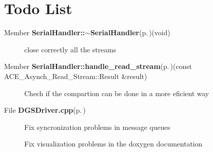 \section{Todo List}\label{todo}
\label{todo__todo000002}
 \begin{description}
\item[Member {\bf Serial\-Handler::$\sim$Serial\-Handler}{\rm (p.\,\pageref{classSerialHandler_a1})}(void) ]close correctly all the streams \end{description}


\label{todo__todo000003}
 \begin{description}
\item[Member {\bf Serial\-Handler::handle\_\-read\_\-stream}{\rm (p.\,\pageref{classSerialHandler_b0})}(const ACE\_\-Asynch\_\-Read\_\-Stream::Result \&result) ]Chech if the compartion can be done in a more eficient way \end{description}


\label{todo__todo000001}
 \begin{description}
\item[File {\bf DGSDriver.cpp}{\rm (p.\,\pageref{DGSDriver_8cpp})} ]Fix syncronization problems in message queues 

Fix visualization problems in the doxygen documentation \end{description}
